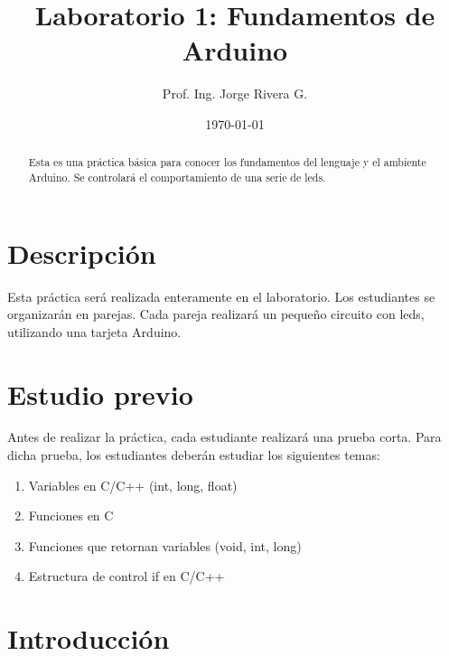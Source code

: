 \documentclass[12pt,letterpaper]{IEEEtran}
\title{Laboratorio 1: Fundamentos de Arduino}
\author{Prof. Ing. Jorge Rivera G.}
\date{\today}
\begin{document}

\renewcommand{\leftmark}{UNIVERSIDAD LATINA DE COSTA RICA -- IEC-650 LABORATORIO DE SISTEMAS DIGITALES}

\maketitle


\begin{abstract}
Esta es una práctica básica para conocer los fundamentos del lenguaje y el ambiente Arduino. Se controlará el comportamiento de una serie de leds.
\end{abstract}
\section{Descripción}

Esta práctica será realizada enteramente en el laboratorio. Los estudiantes se organizarán en parejas. Cada pareja realizará un pequeño circuito con leds, utilizando una tarjeta Arduino.


\section{Estudio previo}

Antes de realizar la práctica, cada estudiante realizará una prueba corta. Para dicha prueba, los estudiantes deberán estudiar los siguientes temas:

\begin{enumerate}
	\item Variables en C/C++ (int, long, float)
	\item Funciones en C
	\item Funciones que retornan variables (void, int, long)
	\item Estructura de control if en C/C++
\end{enumerate}

\section{Introducción}
\end{document}
